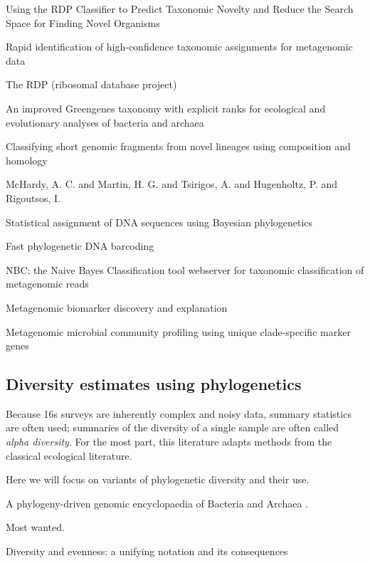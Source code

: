 \documentclass{amsart}
\begin{document}
\cite{lan2012using}
Using the RDP Classifier to Predict Taxonomic Novelty and Reduce the Search Space for Finding Novel Organisms

\cite{macdonald2012rapid}
Rapid identification of high-confidence taxonomic assignments for metagenomic data

\cite{maidak1997rdp}
The RDP (ribosomal database project)

\cite{mcdonald2011improved}
An improved Greengenes taxonomy with explicit ranks for ecological and evolutionary analyses of bacteria and archaea

\cite{parks2011classifying}
Classifying short genomic fragments from novel lineages using composition and homology

\cite{phylopythia}
McHardy, A. C.  and Martin, H. G.  and Tsirigos, A.  and Hugenholtz, P.  and Rigoutsos, I.

\cite{munch2008statistical}
Statistical assignment of DNA sequences using Bayesian phylogenetics

\cite{munch2008fast}
Fast phylogenetic DNA barcoding

\cite{rosen2011nbc}
NBC: the Naive Bayes Classification tool webserver for taxonomic classification of metagenomic reads

\cite{segata2011metagenomic}
Metagenomic biomarker discovery and explanation

\cite{segata2012metagenomic}
Metagenomic microbial community profiling using unique clade-specific marker genes



\subsection{Diversity estimates using phylogenetics}

Because 16s surveys are inherently complex and noisy data, summary statistics are often used; summaries of the diversity of a single sample are often called \emph{alpha diversity}.
For the most part, this literature adapts methods from the classical ecological literature.

Here we will focus on variants of phylogenetic diversity and their use.



A phylogeny-driven genomic encyclopaedia of Bacteria and Archaea \cite{wu2009phylogeny}.

Most wanted.

\cite{hill1973diversity}
Diversity and evenness: a unifying notation and its consequences
\end{document}
